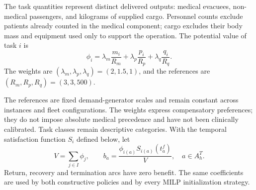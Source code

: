 The task quantities represent distinct delivered outputs: medical evacuees,
non-medical passengers, and kilograms of supplied cargo. Personnel counts
exclude patients already counted in the medical component; cargo excludes
their body mass and equipment used only to support the operation.
The potential value of task $i$ is
\[
\phi_i=\lambda_m\frac{m_i}{R_m}
      +\lambda_p\frac{p_i}{R_p}
      +\lambda_q\frac{q_i}{R_q}.
\]
The weights are $(\lambda_m,\lambda_p,\lambda_q)=(2,1.5,1)$, and the references are $(R_m,R_p,R_q)=(3,3,500)$.

The references are fixed demand-generator scales and remain constant across
instances and fleet configurations. The weights express compensatory
preferences; they do not impose absolute medical precedence and have not
been clinically calibrated. Task classes remain descriptive categories.
With the temporal satisfaction function $S_i$ defined below, let
\[
V=\sum_{j\in I}\phi_j,
\qquad b_a=\frac{\phi_{i(a)}S_{i(a)}(t_a^f)}{V},\quad a\in A_h^T.
\]
Return, recovery and termination arcs have zero benefit. The same coefficients
are used by both constructive policies and by every MILP initialization strategy.
